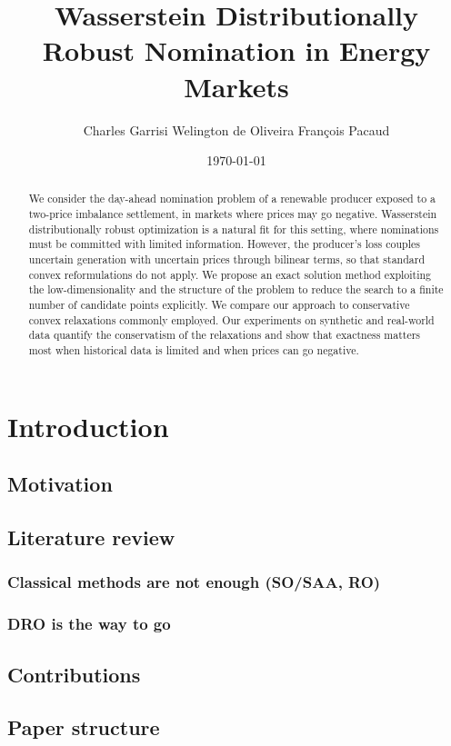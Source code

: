 \documentclass[11pt]{article}
\title{Wasserstein Distributionally Robust Nomination in Energy Markets}
\author{Charles Garrisi \qquad Welington de Oliveira \qquad François Pacaud}
\date{\today}
\theoremstyle{plain}
\theoremstyle{definition}
\begin{document}
\maketitle

\begin{abstract}
We consider the day-ahead nomination problem of a renewable producer exposed to a two-price imbalance settlement, in markets where prices may go negative.
Wasserstein distributionally robust optimization is a natural fit for this setting, where nominations must be committed with limited information.
However, the producer's loss couples uncertain generation with uncertain prices through bilinear terms, so that standard convex reformulations do not apply. 
We propose an exact solution method exploiting the low-dimensionality and the structure of the problem to reduce the search to a finite number of candidate points explicitly.
We compare our approach to conservative convex relaxations commonly employed.
Our experiments on synthetic and real-world data quantify the conservatism of the relaxations and show that exactness matters most when historical data is limited and when prices can go negative.
\end{abstract}

\vspace{2em}
\tableofcontents

\section{Introduction}
\subsection{Motivation}
\subsection{Literature review}
\subsubsection{Classical methods are not enough (SO/SAA, RO)}
\subsubsection{DRO is the way to go}
\subsection{Contributions}
\subsection{Paper structure}
\end{document}
